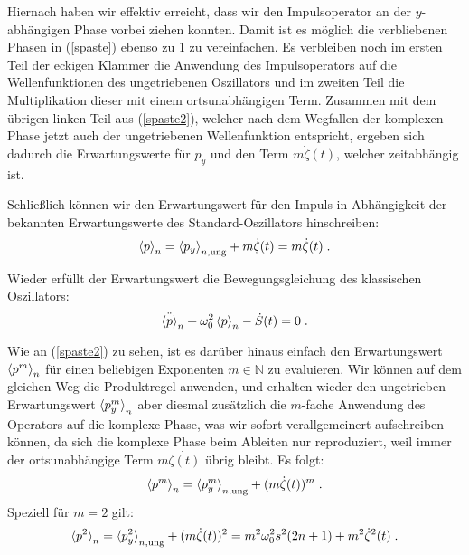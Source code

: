     Hiernach haben wir effektiv erreicht, dass wir den Impulsoperator an der $y$-abhängigen Phase vorbei ziehen konnten.
    Damit ist es möglich die verbliebenen Phasen in (\ref{spaste}) ebenso zu 1 zu vereinfachen.
    Es verbleiben noch im ersten Teil der eckigen Klammer die Anwendung des Impulsoperators auf die Wellenfunktionen des ungetriebenen Oszillators und im zweiten Teil die Multiplikation dieser mit einem ortsunabhängigen Term.
    Zusammen mit dem übrigen linken Teil aus (\ref{spaste2}), welcher nach dem Wegfallen der komplexen Phase jetzt auch der ungetriebenen Wellenfunktion entspricht, ergeben sich dadurch die Erwartungswerte für $p_y$ und den Term $m\dot{\zeta}(t)$, welcher zeitabhängig ist.

    Schließlich können wir den Erwartungswert für den Impuls in Abhängigkeit der bekannten Erwartungswerte des Standard-Oszillators hinschreiben:
    \begin{align}
      \braket{p}_n = \braket{p_y}_{n,\text{ung}} + m\dot{\zeta}(t) = m\dot{\zeta}(t) \; .
      \label{erwartungswert_p_einzelner}
    \end{align}

    Wieder erfüllt der Erwartungswert die Bewegungsgleichung des klassischen Oszillators:
    \begin{equation}
      \ddot{\braket{p}}_n + \omega_0^2\braket{p}_n - \dot{S}(t) = 0 \; .
    \end{equation}

    Wie an (\ref{spaste2}) zu sehen, ist es darüber hinaus einfach den Erwartungswert $\braket{p^m}_n$ für einen beliebigen Exponenten $m \in \mathbb{N}$ zu evaluieren.
    Wir können auf dem gleichen Weg die Produktregel anwenden, und erhalten wieder den ungetrieben Erwartungswert $\braket{p^m_y}_n$ aber diesmal zusätzlich die $m$-fache Anwendung des Operators auf die komplexe Phase, was wir sofort verallgemeinert aufschreiben können, da sich die komplexe Phase beim Ableiten nur reproduziert, weil immer der ortsunabhängige Term $m\dot{\zeta(t)}$ übrig bleibt.
    Es folgt:
    \begin{equation}
      \braket{p^m}_n = \braket{p^m_y}_{n,\text{ung}} + (m\dot{\zeta}(t))^m \; .
    \end{equation}
    Speziell für $m=2$ gilt:
    \begin{equation}
      \braket{p^2}_n = \braket{p^2_y}_{n,\text{ung}} + (m\dot{\zeta}(t))^2 = m^2\omega^2_0 s^2(2n+1) + m^2\dot{\zeta}^2(t) \; .
      \label{erwartungswert_p^2_einzelner}
    \end{equation}


